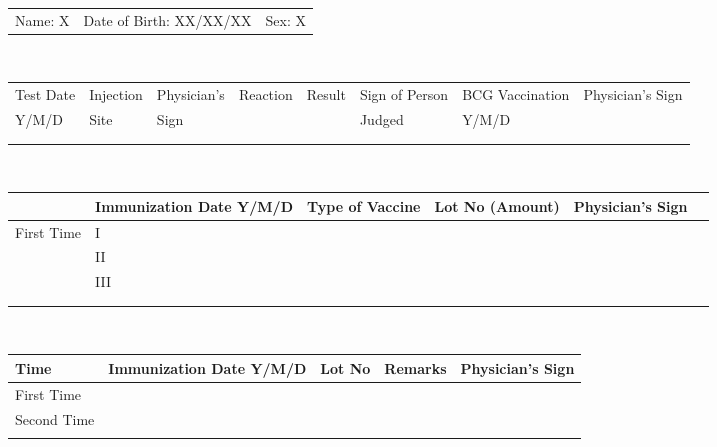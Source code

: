 \documentclass[10pt]{article}
\newcommand{\tablefontsize}{\small}
\begin{document}
\noindent
{\small
\begin{tabular}{lll}
Name: X & Date of Birth: XX/XX/XX & Sex: X
\end{tabular}
}

\vspace{0.8cm}

\\[0.2cm]
{\tablefontsize
\begin{tabular}{|l|l|l|l|l|l||l|p{3.5cm}|}
\hline
\rowcolor{lightgray}
Test Date & Injection & Physician's & Reaction & Result & Sign of Person & BCG Vaccination & Physician's Sign \\
\rowcolor{lightgray}
Y/M/D & Site & Sign & & & Judged & Y/M/D & \\
\hline
      &      &      & &  &       & & \\
 &    &      & &   &  &   & \\
\hline
\end{tabular}
}

\vspace{0.8cm}

\\[0.2cm]
{\tablefontsize
\begin{tabular}{|l|l|l|l|l|l|}
\hline
\rowcolor{lightgray}
\multicolumn{2}{|l|}{Time} & Immunization Date Y/M/D & Type of Vaccine & Lot No (Amount) & Physician's Sign \\
\hline
\multirow{3}{*}{First Time} & I &  &  &  & \\
\cline{2-6}
& II &           &     &                  & \\
\cline{2-6}
& III &           &     &                  & \\
\hline
            & &            & &   &                            \\
\hline
            & &           &  &  & \\
\hline
\end{tabular}
}

\vspace{0.8cm}

\\[0.2cm]
{\tablefontsize
\begin{tabular}{|l|l|l|l|l|}
\hline
\rowcolor{lightgray}
Time & Immunization Date Y/M/D & Lot No & Remarks & Physician's Sign \\
\hline
First Time &            & & & \\
\hline
Second Time &           & & & \\
            &           & & & \\
\hline
\end{tabular}
}
\end{document}
